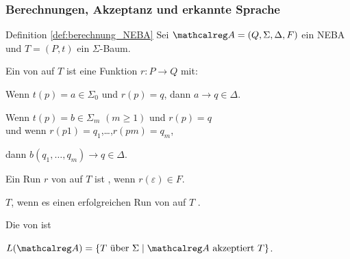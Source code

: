     \begin{frame}[t]
      \frametitle{Berechnungen, Akzeptanz und erkannte Sprache}
      \begin{block}{Definition \ref{def:berechnung_NEBA}}
        Sei $\Aut{A} = (Q,\Sigma,\Delta,F)$ ein NEBA und $T=(P,t)$ ein $\Sigma$-Baum.
        \begin{Itemize}
          \item
            Ein  von  auf $T$
            ist eine Funktion $r : P \to Q$ mit:
            \begin{Itemize}
              \item
                Wenn $t(p) = a \in \Sigma_0$ und $r(p) = q$, dann $a \to q \in \Delta$.
              \item
                Wenn $t(p) = b \in \Sigma_m$ $(m \geqslant 1)$ und $r(p) = q$ \\
                und wenn $r(p1) = q_1$,\quad \dots,\quad $r(pm) = q_m$,
                \par\smallskip
                dann $b(q_1,\dots,q_m) \to q \in \Delta$.%
            \end{Itemize}
            \par\smallskip
          \item
            Ein Run $r$ von  auf $T$ ist , wenn $r(\varepsilon) \in F$.
          \item
              $T$, wenn es einen erfolgreichen Run von  auf $T$ .
          \item
            Die von   ist
            \par
            $L(\Aut{A}) = \{T \text{~über~} \Sigma \mid \Aut{A} \text{~akzeptiert~} T\}$.
        \end{Itemize}
      \end{block}

    \end{frame}


